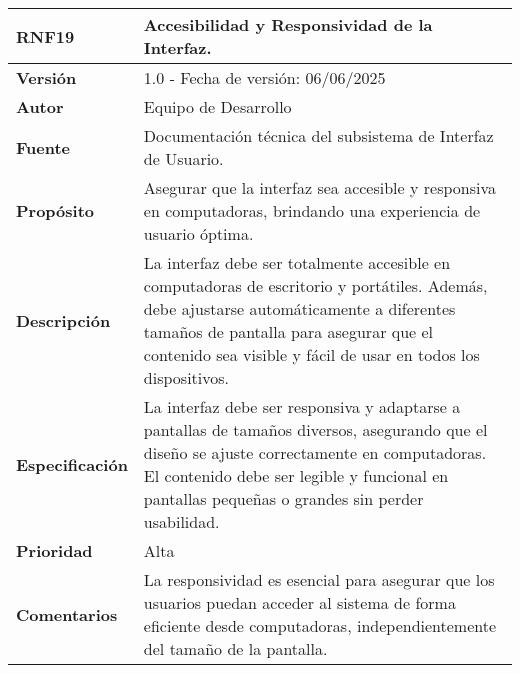 
\begin{longtable}{|l|p{12cm}|}
\hline
\textbf{RNF19} & \textbf{Accesibilidad y Responsividad de la Interfaz.} \\
\hline
\endfirsthead
\hline
\textbf{Versión} & 1.0 - Fecha de versión: 06/06/2025 \\
\hline
\textbf{Autor} & Equipo de Desarrollo \\
\hline
\textbf{Fuente} & Documentación técnica del subsistema de Interfaz de Usuario. \\
\hline
\textbf{Propósito} & Asegurar que la interfaz sea accesible y responsiva en computadoras, brindando una experiencia de usuario óptima. \\
\hline
\textbf{Descripción} & La interfaz debe ser totalmente accesible en computadoras de escritorio y portátiles. Además, debe ajustarse automáticamente a diferentes tamaños de pantalla para asegurar que el contenido sea visible y fácil de usar en todos los dispositivos. \\
\hline
\textbf{Especificación} & La interfaz debe ser responsiva y adaptarse a pantallas de tamaños diversos, asegurando que el diseño se ajuste correctamente en computadoras. El contenido debe ser legible y funcional en pantallas pequeñas o grandes sin perder usabilidad. \\
\hline
\textbf{Prioridad} & Alta \\
\hline
\textbf{Comentarios} & La responsividad es esencial para asegurar que los usuarios puedan acceder al sistema de forma eficiente desde computadoras, independientemente del tamaño de la pantalla. \\
\hline
\end{longtable}

